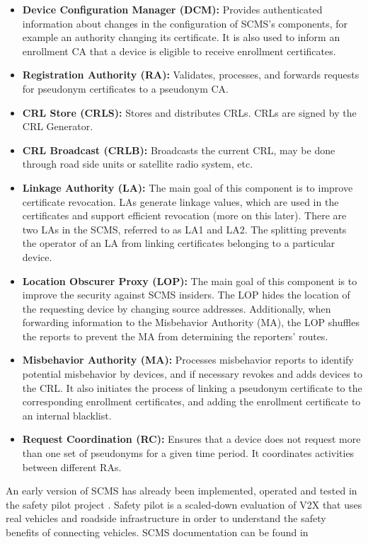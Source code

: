 \begin{itemize}
	\item \textbf{Device Configuration Manager (DCM):} Provides authenticated information about changes in the configuration of SCMS's components, for example an authority changing its certificate. It is also used to inform an enrollment CA that a device is eligible to receive enrollment certificates.
	\item \textbf{Registration Authority (RA):} Validates, processes, and forwards requests for pseudonym certificates to a pseudonym CA.
	\item \textbf{CRL Store (CRLS):} Stores and distributes CRLs. CRLs are signed by the CRL Generator.
	\item \textbf{CRL Broadcast (CRLB):} Broadcasts the current CRL, may be done through road side units or satellite radio system, etc.
	\item \textbf{Linkage Authority (LA):} The main goal of this component is to improve certificate revocation. LAs generate linkage values, which are used in the certificates and support efficient revocation (more on this later). There are two LAs in the SCMS, referred to as LA1 and LA2. The splitting prevents the operator of an LA from linking certificates belonging to a particular device. 
	\item \textbf{Location Obscurer Proxy (LOP):} The main goal of this component is to improve the security against SCMS insiders. The LOP hides the location of the requesting device by changing source addresses. Additionally, when forwarding information to the Misbehavior Authority (MA), the LOP shuffles the reports to prevent the MA from determining the reporters’ routes.
	\item \textbf{Misbehavior Authority (MA):} Processes misbehavior reports to identify potential misbehavior by devices, and if necessary revokes and adds devices to the CRL. It also initiates the process of linking a pseudonym certificate to the corresponding enrollment certificates, and adding the enrollment certificate to an internal blacklist.
	\item \textbf{Request Coordination (RC):} Ensures that a device does not request more than one set of pseudonyms for a given time period. It coordinates activities between different RAs.
\end{itemize}

An early version of SCMS has already been implemented, operated and tested in the safety pilot project \cite{safty_pilot}. Safety pilot is a scaled-down evaluation of V2X that uses real vehicles and roadside infrastructure in order to understand the safety benefits of connecting vehicles. SCMS documentation  can be found in \cite{scms_doc}

